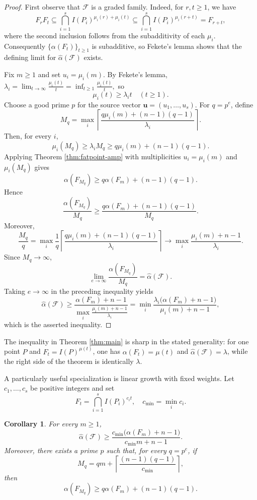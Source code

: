 \documentclass[11pt]{amsart}
\newtheorem{corollary}[theorem]{Corollary}
\theoremstyle{remark}
\begin{document}
\begin{proof}
First observe that $\mathcal F$ is a graded family. Indeed, for $r,t\ge1$, we have
$$
F_rF_t \subseteq \bigcap_{i=1}^s I(P_i)^{\mu_i(r)+\mu_i(t)} \subseteq \bigcap_{i=1}^s I(P_i)^{\mu_i(r+t)}
=F_{r+t},
$$
where the second inclusion follows from the subadditivity of each $\mu_i$. Consequently $\{\alpha(F_t)\}_{t \ge 1}$ is subadditive, so Fekete's lemma shows that the defining limit for $\widehat\alpha(\mathcal F)$ exists.

Fix $m\ge1$ and set $u_i=\mu_i(m)$. By Fekete's lemma,
$
\displaystyle \lambda_i
=
\lim_{t\to\infty}\frac{\mu_i(t)}t
=
\inf_{t\ge1}\frac{\mu_i(t)}t,
$
so
$$
\mu_i(t)\ge\lambda_it
\quad(t\ge1).
$$
Choose a good prime $p$ for the source vector $\mathbf u = (u_1, \dots, u_s)$. For $q=p^e$, define
$$
M_q
=
\max_i
\left\lceil
\frac{q\mu_i(m)+(n-1)(q-1)}{\lambda_i}
\right\rceil.
$$
Then, for every $i$,
$$
\mu_i(M_q)
\ge\lambda_iM_q
\ge q\mu_i(m)+(n-1)(q-1).
$$
Applying Theorem \ref{thm:fatpoint-amp} with multiplicities $u_i=\mu_i(m)$ and $\mu_i(M_q)$ gives
$$
\alpha(F_{M_q})
\ge
q\alpha(F_m)+(n-1)(q-1).
$$
Hence
$$
\frac{\alpha(F_{M_q})}{M_q}
\ge
\frac{q\alpha(F_m)+(n-1)(q-1)}{M_q}.
$$
Moreover,
$$
\frac{M_q}{q} = \max_i \frac1q \left\lceil \frac{q\mu_i(m)+(n-1)(q-1)}{\lambda_i} \right\rceil \longrightarrow
\max_i \frac{\mu_i(m)+n-1}{\lambda_i}.
$$
Since $M_q\to\infty$,
$$
\lim_{e\to\infty}
\frac{\alpha(F_{M_q})}{M_q}
=
\widehat\alpha(\mathcal F).
$$
Taking $e\to\infty$ in the preceding inequality yields
$$
\widehat\alpha(\mathcal F) \ge
\frac{\alpha(F_m)+n-1}
{\displaystyle\max_i\frac{\mu_i(m)+n-1}{\lambda_i}} =
\min_i
\frac{\lambda_i\bigl(\alpha(F_m)+n-1\bigr)}
{\mu_i(m)+n-1},
$$
which is the asserted inequality.
\end{proof}


The inequality in Theorem \ref{thm:main} is sharp in the stated generality: for one point $P$ and $F_t=I(P)^{\mu(t)}$, one has $\alpha(F_t)=\mu(t)$ and $\widehat\alpha(\mathcal F)=\lambda$, while the right side of the theorem is identically $\lambda$.

A particularly useful specialization is linear growth with fixed weights. Let $c_1,\ldots,c_s$ be positive integers and set
$$
F_t=\bigcap_{i=1}^s I(P_i)^{c_it},
\quad
c_{\min}=\min_i c_i.
$$

\begin{corollary}\label{cor:weighted}
For every $m\ge1$,
\begin{equation}\label{eq:weighted}
\widehat\alpha(\mathcal F)
\ge
\frac{c_{\min}\bigl(\alpha(F_m)+n-1\bigr)}{c_{\min}m+n-1}.
\end{equation}
Moreover, there exists a prime $p$ such that, for every $q=p^e$, if
$$
M_q
=
qm+
\left\lceil\frac{(n-1)(q-1)}{c_{\min}}\right\rceil,
$$
then
$$
\alpha(F_{M_q})
\ge
q\alpha(F_m)+(n-1)(q-1).
$$
\end{corollary}
\end{document}
